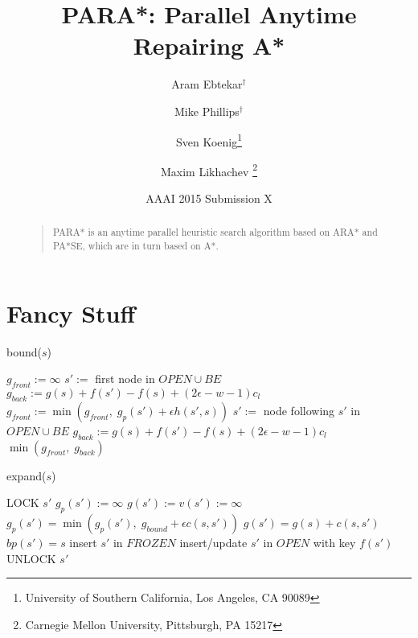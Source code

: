 \documentclass[letterpaper]{article}
\begin{document}
%
\title{PARA*: Parallel Anytime Repairing A*}
\author{Aram Ebtekar$^\dagger$ \and Mike Phillips$^\dagger$ \and Sven Koenig\thanks{University of Southern California, Los Angeles, CA 90089} \and Maxim Likhachev%
\thanks{Carnegie Mellon University, Pittsburgh, PA 15217}%
%
}
\author{AAAI 2015 Submission X}%
\maketitle
\begin{abstract}
\begin{quote}
PARA* is an anytime parallel heuristic search algorithm based on ARA* and PA*SE, which are in turn based on A*.
\end{quote}
\end{abstract}

\section{Fancy Stuff}

\begin{algorithm}
\caption{bound($s$)}
\label{alg:bound}
\begin{algorithmic}
\STATE $g_{front} := \infty$
\STATE $s' :=$ first node in $OPEN \cup BE$
\STATE $g_{back} := g(s) + f(s') - f(s) + (2\epsilon-w-1)c_l$
\STATE $g_{front} := \min(g_{front},\;g_p(s') + \epsilon h(s',s))$
\STATE $s' :=$ node following $s'$ in $OPEN \cup BE$
\STATE $g_{back} := g(s) + f(s') - f(s) + (2\epsilon-w-1)c_l$
\ENDWHILE
\RETURN $\min(g_{front},\;g_{back})$
\end{algorithmic}
\end{algorithm}

\begin{algorithm}
\caption{expand($s$)}
\label{alg:expand}
\begin{algorithmic}
\STATE LOCK $s'$
\STATE $g_p(s') := \infty$
\STATE $g(s') := v(s') := \infty$
\ENDIF
\ENDIF
\STATE $g_p(s') = \min(g_p(s'),\; g_{bound} + \epsilon c(s,s'))$
\STATE $g(s') = g(s) + c(s,s')$
\STATE $bp(s') = s$
\STATE insert $s'$ in $FROZEN$
\ELSE
\STATE insert/update $s'$ in $OPEN$ with key $f(s')$
\ENDIF
\ENDIF
\STATE UNLOCK $s'$
\ENDFOR

\end{algorithmic}
\end{algorithm}
\end{document}
